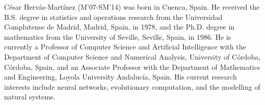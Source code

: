 \documentclass[journal]{IEEEtran}
\begin{document}
	\begin{IEEEbiography}{César Hervás-Martínez}  (M'07-SM'14) was born in Cuenca, Spain. He received the B.S. degree in statistics and operations research from the Universidad Complutense de Madrid, Madrid, Spain, in 1978, and the Ph.D. degree in mathematics from the University of Seville, Seville, Spain, in 1986.
	He is currently a Professor of Computer Science and Artificial Intelligence with the Department of Computer Science and Numerical Analysis, University of Córdoba, Córdoba, Spain, and an Associate Professor with the Department of Mathematics and Engineering, Loyola University Andalucía, Spain. His current research interests include neural networks, evolutionary computation, and the modelling of natural systems.
	\end{IEEEbiography}
%	
%	
	
\end{document}

